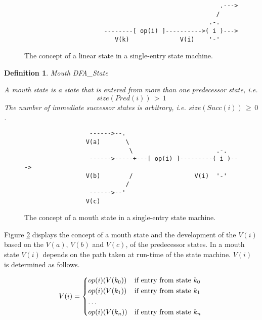 \documentclass[12pt,a4paper]{scrartcl}
\newtheorem{definition}{Definition}
\begin{document}
\begin{figure}[htbp] \leavevmode \label{fig:linear-state}
\begin{verbatim}
                                                      .---> 
                                                     /
                                                   .-.
                      --------[ op(i) ]---------->( i )---> 
                         V(k)              V(i)    '-'

\end{verbatim}
\caption{The concept of a linear state in a single-entry state machine.}
\end{figure}

\begin{definition}
Mouth DFA_State

A mouth state is a state that is entered from more than one predecessor 
state, i.e.
\begin{equation}
                           size(Pred(i))\,>\,1
\end{equation}
The number of immediate successor states is arbitrary, i.e.
$size(Succ(i))\,\ge\,0$.

\end{definition}
    
\begin{figure}[htbp] \leavevmode \label{fig:mouth-state}
\begin{verbatim}
                  ------>--.  
                 V(a)       \ 
                             \                       .-.
                  ------>-----+---[ op(i) ]---------( i )---> 
                 V(b)        /                 V(i)  '-'
                            /
                  ------>--'
                 V(c)

\end{verbatim}
\caption{The concept of a mouth state in a single-entry state machine.}
\end{figure}

Figure \ref{fig:mouth-state} displays the concept of a mouth state and the
development of the $V(i)$ based on the $V(a),\,V(b)$ and $V(c)$, of the
predecessor states. In a mouth state $V(i)$ depends on the path taken at
run-time of the state machine.  $V(i)$ is determined as follows.

\begin{equation} \label{eq:interference}
    V(i) = \begin{dcases*}
            op(i)(V(k_0)) & if entry from state $k_0$ \\
            op(i)(V(k_1)) & if entry from state $k_1$ \\
            \ldots \\
            op(i)(V(k_n)) & if entry from state $k_n$ \\
            \end{dcases*}
\end{equation}
\end{document}
